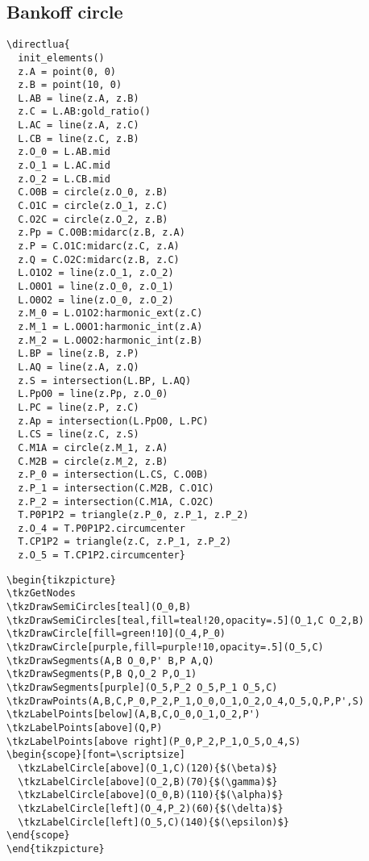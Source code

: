 \subsection{Bankoff circle} %
\label{sub:bankoff_circle}
\begin{verbatim}
\directlua{
  init_elements()
  z.A = point(0, 0)
  z.B = point(10, 0)
  L.AB = line(z.A, z.B)
  z.C = L.AB:gold_ratio()
  L.AC = line(z.A, z.C)
  L.CB = line(z.C, z.B)
  z.O_0 = L.AB.mid
  z.O_1 = L.AC.mid
  z.O_2 = L.CB.mid
  C.O0B = circle(z.O_0, z.B)
  C.O1C = circle(z.O_1, z.C)
  C.O2C = circle(z.O_2, z.B)
  z.Pp = C.O0B:midarc(z.B, z.A)
  z.P = C.O1C:midarc(z.C, z.A)
  z.Q = C.O2C:midarc(z.B, z.C)
  L.O1O2 = line(z.O_1, z.O_2)
  L.O0O1 = line(z.O_0, z.O_1)
  L.O0O2 = line(z.O_0, z.O_2)
  z.M_0 = L.O1O2:harmonic_ext(z.C)
  z.M_1 = L.O0O1:harmonic_int(z.A)
  z.M_2 = L.O0O2:harmonic_int(z.B)
  L.BP = line(z.B, z.P)
  L.AQ = line(z.A, z.Q)
  z.S = intersection(L.BP, L.AQ)
  L.PpO0 = line(z.Pp, z.O_0)
  L.PC = line(z.P, z.C)
  z.Ap = intersection(L.PpO0, L.PC)
  L.CS = line(z.C, z.S)
  C.M1A = circle(z.M_1, z.A)
  C.M2B = circle(z.M_2, z.B)
  z.P_0 = intersection(L.CS, C.O0B)
  z.P_1 = intersection(C.M2B, C.O1C)
  z.P_2 = intersection(C.M1A, C.O2C)
  T.P0P1P2 = triangle(z.P_0, z.P_1, z.P_2)
  z.O_4 = T.P0P1P2.circumcenter
  T.CP1P2 = triangle(z.C, z.P_1, z.P_2)
  z.O_5 = T.CP1P2.circumcenter}
\end{verbatim}

\begin{verbatim}
\begin{tikzpicture}
\tkzGetNodes
\tkzDrawSemiCircles[teal](O_0,B)
\tkzDrawSemiCircles[teal,fill=teal!20,opacity=.5](O_1,C O_2,B)
\tkzDrawCircle[fill=green!10](O_4,P_0)
\tkzDrawCircle[purple,fill=purple!10,opacity=.5](O_5,C)
\tkzDrawSegments(A,B O_0,P' B,P A,Q)
\tkzDrawSegments(P,B Q,O_2 P,O_1)
\tkzDrawSegments[purple](O_5,P_2 O_5,P_1 O_5,C)
\tkzDrawPoints(A,B,C,P_0,P_2,P_1,O_0,O_1,O_2,O_4,O_5,Q,P,P',S)
\tkzLabelPoints[below](A,B,C,O_0,O_1,O_2,P')
\tkzLabelPoints[above](Q,P)
\tkzLabelPoints[above right](P_0,P_2,P_1,O_5,O_4,S)
\begin{scope}[font=\scriptsize]
  \tkzLabelCircle[above](O_1,C)(120){$(\beta)$}
  \tkzLabelCircle[above](O_2,B)(70){$(\gamma)$}
  \tkzLabelCircle[above](O_0,B)(110){$(\alpha)$}
  \tkzLabelCircle[left](O_4,P_2)(60){$(\delta)$}
  \tkzLabelCircle[left](O_5,C)(140){$(\epsilon)$}
\end{scope}
\end{tikzpicture}
\end{verbatim}


